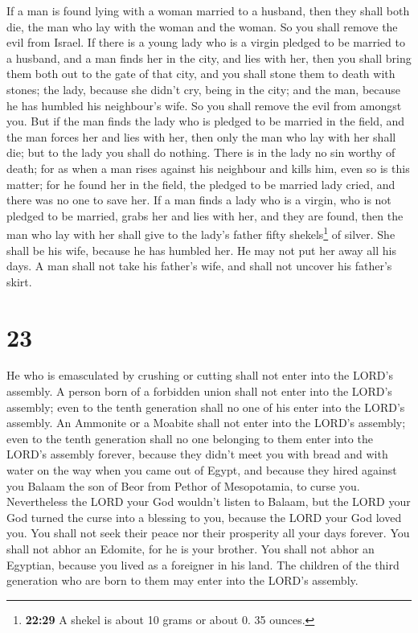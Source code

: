  If a man is found lying with a woman married to a
husband, then they shall both die, the man who lay with the woman and
the woman. So you shall remove the evil from Israel.  If
there is a young lady who is a virgin pledged to be married to a
husband, and a man finds her in the city, and lies with her,
 then you shall bring them both out to the gate of that
city, and you shall stone them to death with stones; the lady, because
she didn't cry, being in the city; and the man, because he has humbled
his neighbour's wife. So you shall remove the evil from amongst you.
 But if the man finds the lady who is pledged to be
married in the field, and the man forces her and lies with her, then
only the man who lay with her shall die;  but to the lady
you shall do nothing. There is in the lady no sin worthy of death; for
as when a man rises against his neighbour and kills him, even so is this
matter;  for he found her in the field, the pledged to be
married lady cried, and there was no one to save her.  If
a man finds a lady who is a virgin, who is not pledged to be married,
grabs her and lies with her, and they are found,  then
the man who lay with her shall give to the lady's father fifty
shekels\footnote{\textbf{22:29} A shekel is about 10 grams or about 0.
  35 ounces.} of silver. She shall be his wife, because he has humbled
her. He may not put her away all his days.  A man shall
not take his father's wife, and shall not uncover his father's skirt.

\hypertarget{section-22}{%
\section{23}\label{section-22}}

 He who is emasculated by crushing or cutting shall not
enter into the LORD's assembly.  A person born of a
forbidden union shall not enter into the LORD's assembly; even to the
tenth generation shall no one of his enter into the LORD's assembly.
 An Ammonite or a Moabite shall not enter into the LORD's
assembly; even to the tenth generation shall no one belonging to them
enter into the LORD's assembly forever,  because they
didn't meet you with bread and with water on the way when you came out
of Egypt, and because they hired against you Balaam the son of Beor from
Pethor of Mesopotamia, to curse you.  Nevertheless the
LORD your God wouldn't listen to Balaam, but the LORD your God turned
the curse into a blessing to you, because the LORD your God loved you.
 You shall not seek their peace nor their prosperity all
your days forever.  You shall not abhor an Edomite, for he
is your brother. You shall not abhor an Egyptian, because you lived as a
foreigner in his land.  The children of the third
generation who are born to them may enter into the LORD's assembly.

